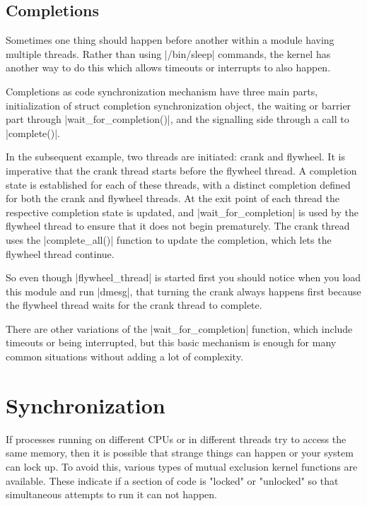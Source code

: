 \documentclass[10pt, oneside]{book}
\begin{document}


\subsection{Completions}
\label{sec:completion}
Sometimes one thing should happen before another within a module having multiple threads.
Rather than using \sh|/bin/sleep| commands, the kernel has another way to do this which allows timeouts or interrupts to also happen.

Completions as code synchronization mechanism have three main parts, initialization of struct completion synchronization object, the waiting or barrier part through \cpp|wait_for_completion()|, and the signalling side through a call to \cpp|complete()|.

In the subsequent example, two threads are initiated: crank and flywheel. 
It is imperative that the crank thread starts before the flywheel thread. 
A completion state is established for each of these threads, with a distinct completion defined for both the crank and flywheel threads.
At the exit point of each thread the respective completion state is updated, and \cpp|wait_for_completion| is used by the flywheel thread to ensure that it does not begin prematurely.
The crank thread uses the \cpp|complete_all()| function to update the completion, which lets the flywheel thread continue.

So even though \cpp|flywheel_thread| is started first you should notice when you load this module and run \sh|dmesg|, that turning the crank always happens first because the flywheel thread waits for the crank thread to complete.

There are other variations of the \cpp|wait_for_completion| function, which include timeouts or being interrupted, but this basic mechanism is enough for many common situations without adding a lot of complexity.


\section{Synchronization}
\label{sec:synchronization}
If processes running on different CPUs or in different threads try to access the same memory, then it is possible that strange things can happen or your system can lock up.
To avoid this, various types of mutual exclusion kernel functions are available.
These indicate if a section of code is "locked" or "unlocked" so that simultaneous attempts to run it can not happen.
\end{document}
